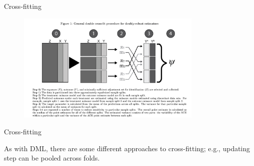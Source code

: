 \documentclass[xcolor={table}, handout]{beamer}
\begin{document}
\note{
\scriptsize \singlespacing

}
\begin{frame}{Cross-fitting}

\begin{figure}
\centering
\includegraphics[width = 0.8\textwidth]{../assets/zivich-breskin_cv.png}
\end{figure}
\hfill \cite{zivich2021machine}
\end{frame}


\begin{frame}{Cross-fitting}

\begin{wideitemize}
\item As with DML, there are some different approaches to cross-fitting; e.g., updating step can be pooled across folds. 
\end{wideitemize}

\end{frame}


\end{document}
